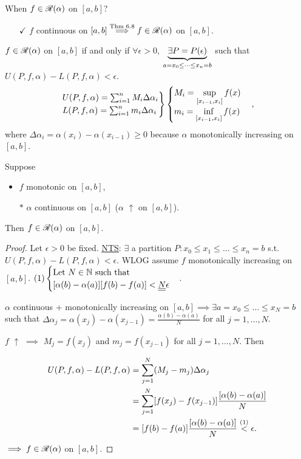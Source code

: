 \documentclass[]{article}
\begin{document}
When $f\in\ms R(\alpha)$ on $[a,b]$?
\begin{enumerate}
	\item[$\checkmark$] $f$ continuous on $[a,b] \os{\text{Thm 6.8}}\implies f\in\ms R(\alpha)$ on $[a,b]$.
\end{enumerate}
\begin{recall}
	$f\in\ms R(\alpha)$ on $[a,b]$ if and only if $\forall\epsilon>0$, $\ub{a=x_0\leq\dots\leq x_n=b}{\exists P=P(\epsilon)}$ such that $U(P,f,\alpha)-L(P,f,\alpha)<\epsilon$.
	$$ \begin{rcases} U(P,f,\alpha) = \sum_{i=1}^n M_i\Delta\alpha_i \\ L(P,f,\alpha) = \sum_{i=1}^n m_i\Delta\alpha_i \end{rcases} \begin{cases} \ds M_i = \sup_{[x_{i-1},x_i]} f(x) \\ \ds m_i = \inf_{[x_{i-1},x_i]} f(x) \end{cases}, $$
	where $\Delta\alpha_i = \alpha(x_i)-\alpha(x_{i-1})\geq0$ because $\alpha$ monotonically increasing on $[a,b]$.
\end{recall}

\begin{theorem}
	Suppose
	\begin{itemize}
		\item $f$ monotonic on $[a,b]$,
	\end{itemize}
	\begin{enumerate}
		\item[$*$] $\alpha$ continuous on $[a,b]$ ($\alpha$ $\uparrow$ on $[a,b]$).
	\end{enumerate}
	Then $f\in\ms R(\alpha)$ on $[a,b]$.
\end{theorem}
\begin{proof}
	Let $\epsilon>0$ be fixed.
	\ul{\ul{NTS}}: $\exists$ a partition $P:x_0\leq x_1\leq\dots\leq x_n=b$ s.t. $U(P,f,\alpha) - L(P,f,\alpha)<\epsilon$.
		WLOG assume $f$ monotonically increasing on $[a,b]$. $(1) \begin{cases} \text{Let }N\in\mb N\text{ such that } \\ [\alpha(b)-\alpha(a)][f(b)-f(a)]<\ul{\ul{N}}\epsilon \end{cases} $.
		
		$\alpha$ continuous + monotonically increasing on $[a,b] \implies \exists a = x_0\leq\dots\leq x_N = b$ such that $\Delta \alpha_j = \alpha(x_j) - \alpha(x_{j-1}) = \frac{\alpha(b)-\alpha(a)}N$ for all $j=1,\dots,N$.
		\begin{note}
			$f$ $\uparrow$ $\implies$ $M_j = f(x_j)$ and $m_j = f(x_{j-1})$ for all $j=1,\dots,N$. Then
		\end{note}
		\begin{align*}
			U(P,f,\alpha)-L(P,f,\alpha) 
				&= \sum_{j=1}^N (M_j-m_j)\Delta\alpha_j \\
				&= \sum_{j=1}^N [f(x_j) - f(x_{j-1})]\frac{[\alpha(b)-\alpha(a)]}N \\
				&= [f(b)-f(a)]\frac{[\alpha(b)-\alpha(a)]}N \os{(1)}< \epsilon.
		\end{align*}
		$\implies f\in\ms R(\alpha)$ on $[a,b]$.
\end{proof}
\end{document}
